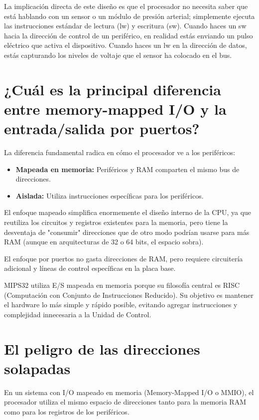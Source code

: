 \documentclass{article}
\begin{document}
La implicación directa de este diseño es que el procesador no necesita saber que está hablando con un sensor o un módulo de presión arterial; simplemente ejecuta las instrucciones estándar de lectura (lw) y escritura (sw). Cuando haces un sw hacia la dirección de control de un periférico, en realidad estás enviando un pulso eléctrico que activa el dispositivo. Cuando haces un lw en la dirección de datos, estás capturando los niveles de voltaje que el sensor ha colocado en el bus.

\section{¿Cuál es la principal diferencia entre memory-mapped I/O y la entrada/salida por 
puertos?}

La diferencia fundamental radica en cómo el procesador ve a los periféricos:

\begin{itemize}
  \item \textbf{Mapeada en memoria:} Periféricos y RAM comparten el mismo bus de direcciones.
  \item \textbf{Aislada:} Utiliza instrucciones específicas para los periféricos.
\end{itemize}

El enfoque mapeado simplifica enormemente el diseño interno de la CPU, ya que reutiliza los circuitos y registros existentes para la memoria, pero tiene la desventaja de "consumir" direcciones que de otro modo podrían usarse para más RAM (aunque en arquitecturas de 32 o 64 bits, el espacio sobra).

El enfoque por puertos no gasta direcciones de RAM, pero requiere circuitería adicional y líneas de control específicas en la placa base.

MIPS32 utiliza E/S mapeada en memoria porque su filosofía central es RISC (Computación con Conjunto de Instrucciones Reducido). Su objetivo es mantener el hardware lo más simple y rápido posible, evitando agregar instrucciones y complejidad innecesaria a la Unidad de Control.

\section{El peligro de las direcciones solapadas}

En un sistema con I/O mapeado en memoria (Memory-Mapped I/O o MMIO), el procesador utiliza el mismo espacio de direcciones tanto para la memoria RAM como para los registros de los periféricos.
\end{document}
